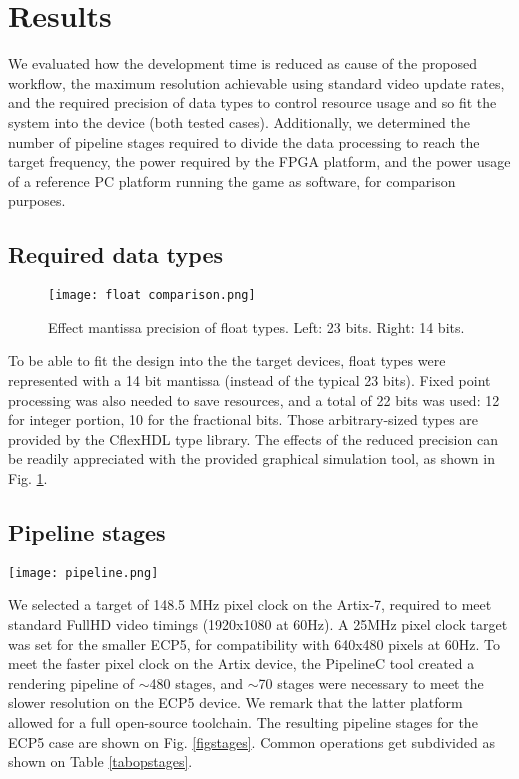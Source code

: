 \documentclass[conference]{IEEEtran}
\begin{document}
\section{Results}

We evaluated how the development time is reduced as cause of the proposed workflow, the maximum resolution achievable using standard video update rates, and the required precision of data types to control resource usage and so fit the system into the device (both tested cases). Additionally, we determined the number of pipeline stages required to divide the data processing to reach the target frequency, the power required by the FPGA platform, and the power usage of a reference PC platform running the game as software, for comparison purposes.

\subsection{Required data types}

\begin{figure}
\texttt{[image: float comparison.png]}
\caption{Effect mantissa precision of float types. Left: 23 bits. Right: 14 bits.}
\label{figprec}
\end{figure}

To be able to fit the design into the the target devices, float types were represented with a 14 bit mantissa (instead of the typical 23 bits). Fixed point processing was also needed to save resources, and a total of 22 bits was used: 12 for integer portion, 10 for the fractional bits. Those arbitrary-sized types are provided by the CflexHDL type library. The effects of the reduced precision can be readily appreciated with the provided graphical simulation tool, as shown in Fig. \ref{figprec}.

\subsection{Pipeline stages}


\begin{figure*}
\texttt{[image: pipeline.png]}
\caption{Resulting pipeline for the ECP5 target.}
\label{figstages}
\end{figure*}

We selected a target of 148.5 MHz pixel clock on the Artix-7, required to meet standard FullHD video timings (1920x1080 at 60Hz). A 25MHz pixel clock target was set for the smaller ECP5, for compatibility with 640x480 pixels at 60Hz.
To meet the faster pixel clock on the Artix device, the PipelineC tool created a rendering pipeline of $\sim$480 stages, and $\sim$70 stages were necessary to meet the slower resolution on the ECP5 device. We remark that the latter platform allowed for a full open-source toolchain. The resulting pipeline stages for the ECP5 case are shown on Fig. \ref{figstages}. Common operations get subdivided as shown on Table \ref{tabopstages}.
\end{document}
